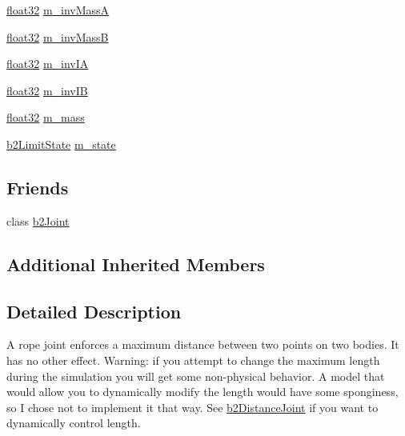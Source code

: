 \begin{DoxyCompactItemize}
\mbox{\hyperlink{b2_settings_8h_aacdc525d6f7bddb3ae95d5c311bd06a1}{float32}} \mbox{\hyperlink{classb2_rope_joint_a690e4fe5ab7a279accac3b137d5f5c76}{m\+\_\+inv\+MassA}}
\item 
\mbox{\hyperlink{b2_settings_8h_aacdc525d6f7bddb3ae95d5c311bd06a1}{float32}} \mbox{\hyperlink{classb2_rope_joint_a9709179725abed80d4957df82bc24512}{m\+\_\+inv\+MassB}}
\item 
\mbox{\hyperlink{b2_settings_8h_aacdc525d6f7bddb3ae95d5c311bd06a1}{float32}} \mbox{\hyperlink{classb2_rope_joint_a1917a65b89668c433d06071970a6875a}{m\+\_\+inv\+IA}}
\item 
\mbox{\hyperlink{b2_settings_8h_aacdc525d6f7bddb3ae95d5c311bd06a1}{float32}} \mbox{\hyperlink{classb2_rope_joint_a1ce440194cec6e275193d7224ce1e448}{m\+\_\+inv\+IB}}
\item 
\mbox{\hyperlink{b2_settings_8h_aacdc525d6f7bddb3ae95d5c311bd06a1}{float32}} \mbox{\hyperlink{classb2_rope_joint_a1f355a976b177b75a8fd47190194d5c1}{m\+\_\+mass}}
\item 
\mbox{\hyperlink{b2_joint_8h_ae7784edce074221afeb010d638404443}{b2\+Limit\+State}} \mbox{\hyperlink{classb2_rope_joint_ac73c9451360c80c8a98376b922f4bed4}{m\+\_\+state}}
\end{DoxyCompactItemize}
\subsection*{Friends}
\begin{DoxyCompactItemize}
\item 
class \mbox{\hyperlink{classb2_rope_joint_a54ade8ed3d794298108d7f4c4e4793fa}{b2\+Joint}}
\end{DoxyCompactItemize}
\subsection*{Additional Inherited Members}


\subsection{Detailed Description}
A rope joint enforces a maximum distance between two points on two bodies. It has no other effect. Warning\+: if you attempt to change the maximum length during the simulation you will get some non-\/physical behavior. A model that would allow you to dynamically modify the length would have some sponginess, so I chose not to implement it that way. See \mbox{\hyperlink{classb2_distance_joint}{b2\+Distance\+Joint}} if you want to dynamically control length. 


